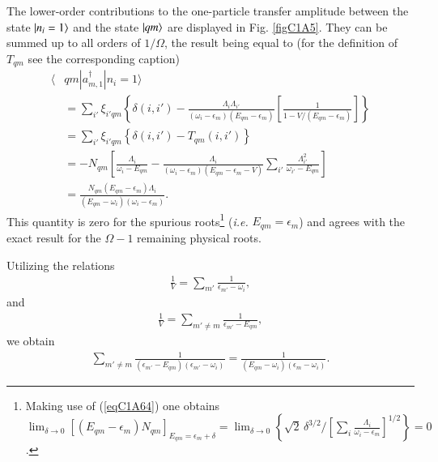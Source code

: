 The lower-order contributions to the one-particle transfer amplitude between the state $|{n_i=1} \rangle$ and the state $|{qm} \rangle$ are displayed in Fig. \ref{figC1A5}. They can be summed up to all orders of $1/\Omega$, the result being equal to (for the definition of $T_{qm}$ see the corresponding caption)
  \begin{align}\label{eqC1A73} 
   \nonumber \langle & qm|a^\dagger_{m,1}|n_i=1\rangle\\
\nonumber &=\sum_{i'}\xi_{i'qm}\left\{\delta(i,i')-\frac{\Lambda_i\Lambda_{i'}}{(\omega_i-\epsilon_m)(E_{qm}-\epsilon_m)}\left[\frac{1}{1-V/(E_{qm}-\epsilon_m)}\right]\right\}\\
\nonumber &=\sum_{i'}\xi_{i'qm}\left\{\delta(i,i')-T_{qm}(i,i')\right\}\\
\nonumber & =-N_{qm}\left[\frac{\Lambda_i}{\omega_i-E_{qm}}-\frac{\Lambda_i}{(\omega_i-\epsilon_m)(E_{qm}-\epsilon_m-V)}\sum_{i'}\frac{\Lambda_{i'}^2}{\omega_{i'}-E_{qm}}\right]\\
&=\frac{N_{qm}(E_{qm}-\epsilon_m)\Lambda_i}{(E_{qm}-\omega_i)(\omega_i-\epsilon_m)}.
\end{align} 
This quantity is zero for the spurious roots\footnote{Making use of (\ref{eqC1A64}) one obtains  $\lim_{\delta\to0}[(E_{qm}-\epsilon_m)N_{qm}]_{E_{qm}=\epsilon_m+\delta}=\lim_{\delta\to0}\left\{\sqrt{2}\,\delta^{3/2}/[\sum_i\frac{\Lambda_i}{\omega_i-\epsilon_m}]^{1/2}\right\}=0$.} (\textit{i.e.} $E_{qm}=\epsilon_m$) and agrees with the exact result for the $\Omega-1$ remaining physical roots. 


Utilizing the relations
  \begin{align}\label{eqC1A74} 
  \frac{1}{V}=\sum_{m'}\frac{1}{\epsilon_{m'}-\omega_i},
    \end{align}  
and  
  \begin{align}\label{eqC1A75} 
   \frac{1}{V}=\sum_{m'\neq m}\frac{1}{\epsilon_{m'}-E_{qm}},
    \end{align} 
we  obtain  
  \begin{align}\label{eqC1A76} 
   \sum_{m'\neq m}\frac{1}{(\epsilon_{m'}-E_{qm})(\epsilon_{m'}-\omega_i)}=\frac{1}{(E_{qm}-\omega_i)(\epsilon_m-\omega_i)}.
    \end{align} 

